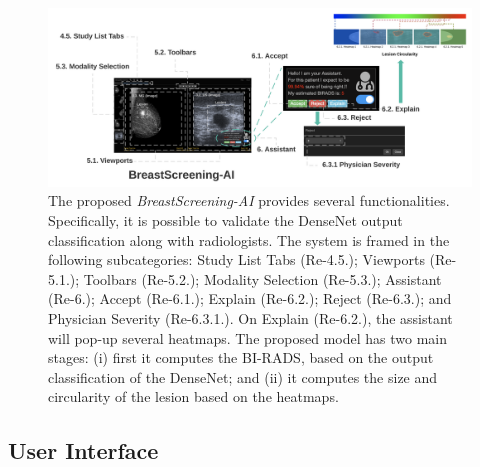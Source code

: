 \begin{figure}[htbp]
\centering
\includegraphics[width=\textwidth]{images/fig040}
\caption{\textcolor{revised}{The proposed {\it BreastScreening-AI} provides several functionalities. Specifically, it is possible to validate the DenseNet output classification along with radiologists. The system is framed in the following subcategories: Study List Tabs (Re-4.5.); Viewports (Re-5.1.); Toolbars (Re-5.2.); Modality Selection (Re-5.3.); Assistant (Re-6.); Accept (Re-6.1.); Explain (Re-6.2.); Reject (Re-6.3.); and Physician Severity (Re-6.3.1.). On Explain (Re-6.2.), the assistant will pop-up several heatmaps. The proposed model has two main stages: (i)  first it computes the BI-RADS, based on the output classification of the DenseNet; and (ii) it computes the size and circularity of the lesion based on the heatmaps.}}
\label{fig:fig040}
\end{figure}

\subsection{User Interface}
\label{sec:chap005004002}

